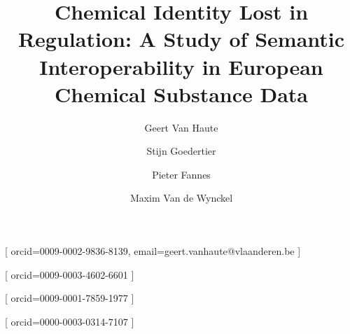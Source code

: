 \documentclass[]{ceurart}
\begin{document}

\title{Chemical Identity Lost in Regulation: A Study of Semantic Interoperability in European Chemical Substance Data}

\address[1]{Environment Department, Flemish Government, Brussels, Belgium}

\author[1]{Geert {Van Haute}}[%
  orcid=0009-0002-9836-8139,
  email=geert.vanhaute@vlaanderen.be
]
\cormark[1]

\author[1]{Stijn Goedertier}[%
  orcid=0009-0003-4602-6601
]

\author[1]{Pieter Fannes}[%
  orcid=0009-0001-7859-1977
]

\author[1]{Maxim {Van de Wynckel}}[%
  orcid=0000-0003-0314-7107
]



\maketitle









\end{document}

